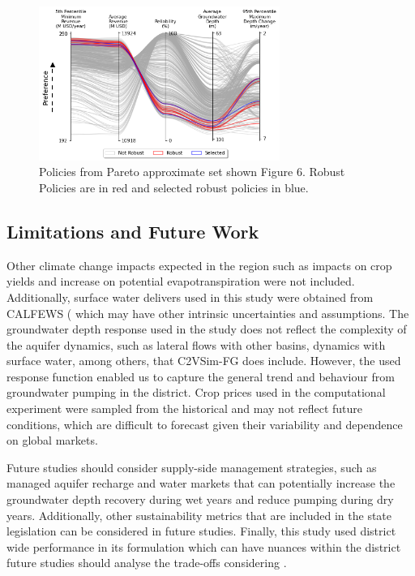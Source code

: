 \documentclass[11pt,a4paper]{article}
\begin{document}
\begin{figure}[H]
    \centering
    \includegraphics[width=0.7\textwidth]{robust_policies_parallel_axis.png}
    \caption{Policies from Pareto approximate set shown Figure 6. Robust Policies are in red and selected robust policies in blue.} \label{fig:parallel_robustness}
\end{figure}

\subsection{Limitations and Future Work}

Other climate change impacts expected in the region such as impacts on crop yields and increase on potential evapotranspiration were not included. Additionally, surface water delivers used in this study were obtained from CALFEWS (\cite{zeff_californias_2021)} which may have other intrinsic uncertainties and assumptions. The groundwater depth response used in the study does not reflect the complexity of the aquifer dynamics, such as lateral flows with other basins, dynamics with surface water, among others, that C2VSim-FG does include. However, the used response function enabled us to capture the general trend and behaviour from groundwater pumping in the district. Crop prices used in the computational experiment were sampled from the historical and may not reflect future conditions, which are difficult to forecast given their variability and dependence on global markets. 

Future studies should consider supply-side management strategies, such as managed aquifer recharge and water markets that can potentially increase the groundwater depth recovery during wet years and reduce pumping during dry years. Additionally, other sustainability metrics that are included in the state legislation can be considered in future studies. Finally, this study used district wide performance in its formulation which can have nuances within the district future studies should analyse the trade-offs considering .
 
\end{document}
